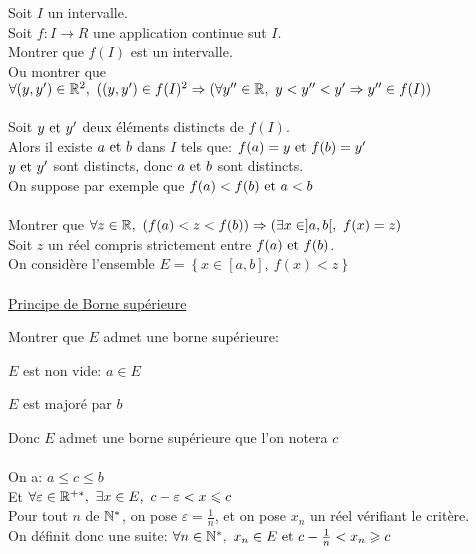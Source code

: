 \documentclass[12pt,twoside,a4paper]{article}
\begin{document}
		\begin{preuve}
			Soit $I$ un intervalle.\\
			Soit $f:I\rightarrow R$ une application continue sut $I$.\\
			Montrer que $f(I)$ est un intervalle.\\
			Ou montrer que $\forall (y,y')\in \R^{2},\ ((y,y')\in f(I)^{2}\Rightarrow (\forall y''\in\R,\ y<y''<y'\Rightarrow y''\in f(I))$\\
			\\
			Soit $y\text{ et } y'$ deux éléments distincts de $f(I)$.\\
			Alors il existe $a\text{ et } b$ dans $I$ tels que: $f(a)=y\text{ et } f(b)=y'$\\
			$y\text{ et } y'$ sont distincts, donc $a\text{ et } b$ sont distincts.\\
			On suppose par exemple que $f(a)<f(b)\text{ et } a<b$\\
			\\
			Montrer que $\forall z\in\R,\ \left( f(a)<z<f(b)\right) \Rightarrow \left( \exists x\in ]a,b[,\ f(x)=z\right) $\\
			Soit $z$ un réel compris strictement entre $f(a)\text{ et } f(b)$.\\
			On considère l'ensemble $E= \left\lbrace x\in [a,b],\ f(x)<z\right\rbrace $\\
			\\
			\underline{Principe de Borne supérieure}
			\begin{tab}
				Montrer que $E$ admet une borne supérieure:\begin{liste}
					\item $E$ est non vide: $a\in E$
					\item $E$ est majoré par $b$
				\end{liste}
				Donc $E$ admet une borne supérieure que l'on notera $c$\\
				\\
				On a: $a\leqslant c\leqslant b$\\
				Et $\forall \varepsilon \in\mathbb{R}^{+*},\ \exists x\in E,\ c-\varepsilon<x\leqslant c$\\
				Pour tout $n$ de $\mathbb{N}^{*}$, on pose $\varepsilon = \frac1{n}$, et on pose $x_n$ un réel vérifiant le critère.\\
				On définit donc une suite: $\forall n\in\mathbb{N}^{*},\ x_n\in E\text{ et } c-\frac1{n}<x_n\geqslant c$
				
			\end{tab}
		\end{preuve}
\end{document}
